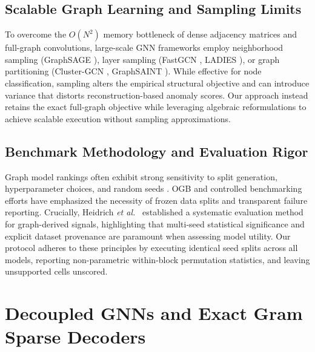 \documentclass[applsci,article,submit,moreauthors,pdftex]{Definitions/mdpi}
\newcommand{\etal}{\emph{et al.}}
\begin{document}
\subsection{Scalable Graph Learning and Sampling Limits}
To overcome the $O(N^2)$ memory bottleneck of dense adjacency matrices and full-graph convolutions, large-scale GNN frameworks employ neighborhood sampling (GraphSAGE \cite{hamilton2017graphsage}), layer sampling (FastGCN \cite{chen2018fastgcn}, LADIES \cite{zou2019ladies}), or graph partitioning (Cluster-GCN \cite{chiang2019clustergcn}, GraphSAINT \cite{zeng2020graphsaint}). While effective for node classification, sampling alters the empirical structural objective and can introduce variance that distorts reconstruction-based anomaly scores. Our approach instead retains the exact full-graph objective while leveraging algebraic reformulations to achieve scalable execution without sampling approximations.

\subsection{Benchmark Methodology and Evaluation Rigor}
Graph model rankings often exhibit strong sensitivity to split generation, hyperparameter choices, and random seeds \cite{shchur2018pitfalls,errica2020fair}. OGB \cite{hu2020ogb} and controlled benchmarking efforts \cite{dwivedi2023benchmarking} have emphasized the necessity of frozen data splits and transparent failure reporting. Crucially, Heidrich \etal\ \cite{heidrich2026systematic} established a systematic evaluation method for graph-derived signals, highlighting that multi-seed statistical significance and explicit dataset provenance are paramount when assessing model utility. Our protocol adheres to these principles by executing identical seed splits across all models, reporting non-parametric within-block permutation statistics, and leaving unsupported cells unscored.

\section{Decoupled GNNs and Exact Gram Sparse Decoders}
\label{sec:models}
\end{document}
